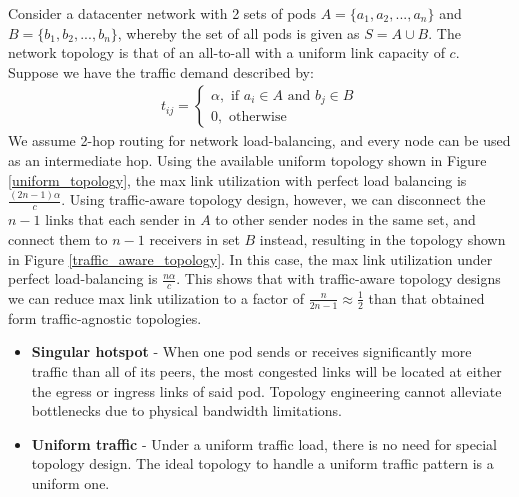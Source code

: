 \documentclass[sigconf]{acmart}
\theoremstyle{definition}
\begin{document}
\begin{appendices}
Consider a datacenter network with 2 sets of pods $A = \{a_1, a_2, ..., a_n\}$ and $B = \{b_1, b_2, ... , b_n\}$, whereby the set of all pods is given as $S = A \cup B$. The network topology is that of an all-to-all with a uniform link capacity of $c$. Suppose we have the traffic demand described by:
\begin{equation}
\begin{aligned}
    t_{ij} = \begin{cases}
                \alpha, \text{ if } a_i \in A \text{ and } b_j \in B\\
                0, \text{ otherwise}
    \end{cases}
\end{aligned}
\label{eqn:bipartite_traffic}
\end{equation}
We assume 2-hop routing for network load-balancing, and every node can be used as an intermediate hop. Using the available uniform topology shown in Figure \ref{uniform_topology}, the max link utilization with perfect load balancing is $\frac{(2n-1)\alpha}{c}$. Using traffic-aware topology design, however, we can disconnect the $n - 1$ links that each sender in $A$ to other sender nodes in the same set, and connect them to $n - 1$ receivers in set $B$ instead, resulting in the topology shown in Figure \ref{traffic_aware_topology}. In this case, the max link utilization under perfect load-balancing is $\frac{n \alpha}{c}$. This shows that with traffic-aware topology designs we can reduce max link utilization to a factor of $\frac{n}{2n - 1} \approx \frac{1}{2}$ than that obtained form traffic-agnostic topologies.
\begin{itemize} 
    \item \textbf{Singular hotspot} - When one pod sends or receives significantly more traffic than all of its peers, the most congested links will be located at either the egress or ingress links of said pod. Topology engineering cannot alleviate bottlenecks due to physical bandwidth limitations.
    \item \textbf{Uniform traffic} - Under a uniform traffic load, there is no need for special topology design. The ideal topology to handle a uniform traffic pattern is a uniform one.
\end{itemize}

\begin{figure}
\centering
\begin{tikzpicture}[->,>=stealth',shorten >=1pt,auto,node distance=1.4cm,
                    thick,main node/.style={circle,draw,font=\sffamily\Small\bfseries}, scale=0.7]


\end{tikzpicture}
\end{figure}
\end{appendices}
\end{document}
